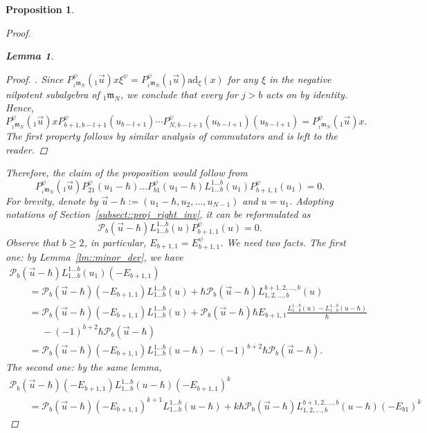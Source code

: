 \documentclass[10pt,a4paper]{article}
\numberwithin{equation}{section}
\newtheorem{Lemma}[Theorem]{Lemma}
\newtheorem{Proposition}[Theorem]{Proposition}
{ \theoremstyle{definition}
	\newtheorem{Definition}[Theorem]{Definition}
	\newtheorem{Note}[Theorem]{Note}
	\newtheorem{Example}[Theorem]{Example}
	\newtheorem{Remark}[Theorem]{Remark} }
\newcommand{\calP}{\mathcal{P}}
\newcommand{\m}{\mathfrak{m}}
\begin{document}
\begin{Proposition}
\begin{proof}
\begin{Lemma}
\begin{proof}
\smash{$
					P_{{}_1\m_{N}}^{\psi}({}_1\vec{u}) \mathrm{ad}_{E_{j,b-l+1}}(x) = 0$}.
					Since
$
					P_{{}_1\m_{N}}^{\psi}({}_1\vec{u}) x \xi^{\psi} = P_{{}_1\m_{N}}^{\psi}({}_1\vec{u}) \mathrm{ad}_{\xi}(x)
$
					for any $\xi$ in the negative nilpotent subalgebra of ${}_1 \m_N$, we conclude that every  for $j>b$ acts on \smash{$P_{{}_1\m_{N}}^{\psi}({}_1\vec{u}) x$} by identity. Hence,
					\[
					P_{{}_1\m_{N}}^{\psi}({}_1\vec{u}) x P_{b+1,b-l+1}^{\psi}(u_{b-l+1}) \cdots P_{N,b-l+1}^{\psi}(u_{b-l+1})(u_{b-l+1}) = P_{{}_1\m_{N}}^{\psi}({}_1\vec{u}) x.
					\]
					The first property follows by similar analysis of commutators and is left to the reader.
				\end{proof}
			\end{Lemma}
			Therefore, the claim of the proposition would follow from
			\[
			P_{{}_1\m_N}^{\psi}({}_1\vec{u}) P_{21}^{\psi}(u_1-\hbar) \dots P_{b1}^{\psi}(u_1-\hbar) L_{1\dots b}^{1\dots b}(u_1) P_{b+1,1}^{\psi}(u_1) = 0.
			\]
			For brevity, denote by $\vec{u} - \hbar := (u_1-\hbar,u_2,\dots,u_{N-1})$ and $u=u_1$. Adopting notations of Section~\ref{subsect::proj_right_inv}, it can be reformulated as
			\[
			\calP_{b}(\vec{u}-\hbar) L_{1\dots b}^{1\dots b}(u) P_{b+1,1}^{\psi} (u) = 0.
			\]
			Observe that $b \geq 2$, in particular, $E_{b+1,1} = E_{b+1,1}^{\psi}$. We need two facts. The first one: by Lemma~\ref{lm::minor_der}, we have
			\begin{gather*}
				\calP_{b}(\vec{u}-\hbar) L_{1\dots b}^{1\dots b}(u_1) (-E_{b+1,1}) \\
				\qquad=\calP_{b}(\vec{u}-\hbar) (-E_{b+1,1}) L_{1\dots b}^{1\dots b}(u) + \hbar \calP_{b}(\vec{u}-\hbar) L_{1,2,\dots,b}^{b+1,2,\dots,b}(u) \\
				\qquad=\calP_{b}(\vec{u}-\hbar) (-E_{b+1,1}) L_{1\dots b}^{1\dots b}(u) + \calP_b(\vec{u}-\hbar)\hbar E_{b+1,1} \frac{L_{1\dots b}^{1\dots b}(u) - L_{1\dots b}^{1\dots b}(u-\hbar)}{\hbar} \\
				\phantom{\qquad=}{}- (-1)^{b+2} \hbar \calP_{b}(\vec{u}-\hbar) \\
				\qquad= \calP_{b}(\vec{u}-\hbar) (-E_{b+1,1}) L_{1\dots b}^{1\dots b}(u-\hbar) - (-1)^{b+2} \hbar \calP_{b}(\vec{u}-\hbar).
			\end{gather*}
			The second one: by the same lemma,
			\begin{gather*}
				\calP_{b}(\vec{u}-\hbar) (-E_{b+1,1}) L_{1\dots b}^{1\dots b}(u-\hbar) (-E_{b+1,1})^{k} \\
				\qquad= \calP_{b}(\vec{u}-\hbar) (-E_{b+1,1})^{k+1} L_{1\dots b}^{1\dots b}(u-\hbar) + k\hbar \calP_{b}(\vec{u}-\hbar) L_{1,2,\dots,b}^{b+1,2,\dots,b}(u-\hbar) (-E_{b1})^k

\end{gather*}
\end{proof}
\end{Proposition}
\end{document}
